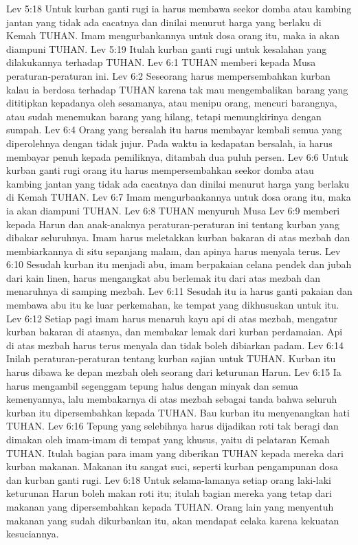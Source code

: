 Lev 5:18  Untuk kurban ganti rugi ia harus membawa seekor domba atau kambing jantan yang tidak ada cacatnya dan dinilai menurut harga yang berlaku di Kemah TUHAN. Imam mengurbankannya untuk dosa orang itu, maka ia akan diampuni TUHAN.
Lev 5:19  Itulah kurban ganti rugi untuk kesalahan yang dilakukannya terhadap TUHAN.
Lev 6:1  TUHAN memberi kepada Musa peraturan-peraturan ini.
Lev 6:2  Seseorang harus mempersembahkan kurban kalau ia berdosa terhadap TUHAN karena tak mau mengembalikan barang yang dititipkan kepadanya oleh sesamanya, atau menipu orang, mencuri barangnya, atau sudah menemukan barang yang hilang, tetapi memungkirinya dengan sumpah.
Lev 6:4  Orang yang bersalah itu harus membayar kembali semua yang diperolehnya dengan tidak jujur. Pada waktu ia kedapatan bersalah, ia harus membayar penuh kepada pemiliknya, ditambah dua puluh persen.
Lev 6:6  Untuk kurban ganti rugi orang itu harus mempersembahkan seekor domba atau kambing jantan yang tidak ada cacatnya dan dinilai menurut harga yang berlaku di Kemah TUHAN.
Lev 6:7  Imam mengurbankannya untuk dosa orang itu, maka ia akan diampuni TUHAN.
Lev 6:8  TUHAN menyuruh Musa
Lev 6:9  memberi kepada Harun dan anak-anaknya peraturan-peraturan ini tentang kurban yang dibakar seluruhnya. Imam harus meletakkan kurban bakaran di atas mezbah dan membiarkannya di situ sepanjang malam, dan apinya harus menyala terus.
Lev 6:10  Sesudah kurban itu menjadi abu, imam berpakaian celana pendek dan jubah dari kain linen, harus mengangkat abu berlemak itu dari atas mezbah dan menaruhnya di samping mezbah.
Lev 6:11  Sesudah itu ia harus ganti pakaian dan membawa abu itu ke luar perkemahan, ke tempat yang dikhususkan untuk itu.
Lev 6:12  Setiap pagi imam harus menaruh kayu api di atas mezbah, mengatur kurban bakaran di atasnya, dan membakar lemak dari kurban perdamaian. Api di atas mezbah harus terus menyala dan tidak boleh dibiarkan padam.
Lev 6:14  Inilah peraturan-peraturan tentang kurban sajian untuk TUHAN. Kurban itu harus dibawa ke depan mezbah oleh seorang dari keturunan Harun.
Lev 6:15  Ia harus mengambil segenggam tepung halus dengan minyak dan semua kemenyannya, lalu membakarnya di atas mezbah sebagai tanda bahwa seluruh kurban itu dipersembahkan kepada TUHAN. Bau kurban itu menyenangkan hati TUHAN.
Lev 6:16  Tepung yang selebihnya harus dijadikan roti tak beragi dan dimakan oleh imam-imam di tempat yang khusus, yaitu di pelataran Kemah TUHAN. Itulah bagian para imam yang diberikan TUHAN kepada mereka dari kurban makanan. Makanan itu sangat suci, seperti kurban pengampunan dosa dan kurban ganti rugi.
Lev 6:18  Untuk selama-lamanya setiap orang laki-laki keturunan Harun boleh makan roti itu; itulah bagian mereka yang tetap dari makanan yang dipersembahkan kepada TUHAN. Orang lain yang menyentuh makanan yang sudah dikurbankan itu, akan mendapat celaka karena kekuatan kesuciannya.
